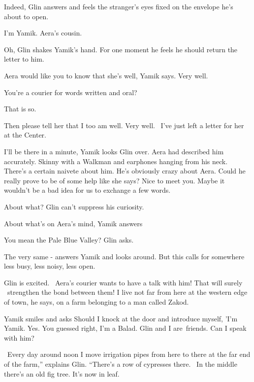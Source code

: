 \documentclass[letterpaper]{article}
\begin{document}
{\textquotedbl}Indeed,{\textquotedbl} Glin answers and feels the stranger's eyes fixed on the envelope he's about to
open. 

{\textquotedbl}I'm Yamik. Aera's cousin.{\textquotedbl} 

{\textquotedbl}Oh,{\textquotedbl} Glin shakes Yamik's hand. For one moment he feels he should return the letter to him.
~

{\textquotedbl}Aera would like you to know that she's well,{\textquotedbl} Yamik says. {\textquotedbl}Very
well.{\textquotedbl} 

{\textquotedbl}You're a courier for words written and oral?{\textquotedbl} 

{\textquotedbl}That is so.{\textquotedbl} 

{\textquotedbl}Then please tell her that I too am well. Very well.~ I've just left a letter for her at the
Center.{\textquotedbl} 

{\textquotedbl}I'll be there in a minute,{\textquotedbl} Yamik looks Glin over. Aera had described him accurately.
Skinny with a Walkman and earphones hanging from his neck. There's a certain naivete about him. He's obviously crazy
about Aera. Could he really prove to be of some help like she says? {\textquotedbl}Nice to meet you. Maybe it wouldn't
be a bad idea for us to exchange a few words.{\textquotedbl} 

{\textquotedbl}About what?{\textquotedbl} Glin can't suppress his curiosity.

{\textquotedbl}About what's on Aera's mind,{\textquotedbl} Yamik answers 

{\textquotedbl}You mean the Pale Blue Valley?{\textquotedbl} Glin asks. 

{\textquotedbl}The very same -{\textquotedbl} answers Yamik and looks around. {\textquotedbl}But this calls for
somewhere less busy, less noisy, less open.{\textquotedbl} 

Glin is excited. \ Aera's courier wants to have a talk with him! That will surely \ strengthen the bond between them!
{\textquotedbl}I live not far from here at the western edge of town,{\textquotedbl} he says, {\textquotedbl}on a farm
belonging to a man called Zakod.{\textquotedbl} 

Yamik smiles and asks {\textquotedbl}Should I knock at the door and introduce myself, 'I'm Yamik. Yes. You guessed
right, I'm a Balad. Glin and I are~friends. Can I speak with him?{\textquotedbl} 

\ {\textquotedbl}Every day around noon I move irrigation pipes from here to there at the far end of the farm,'' explains
Glin. ``There's a row of cypresses there. ~In the middle there's an old fig tree. It's now in leaf.{\textquotedbl} 
\end{document}
